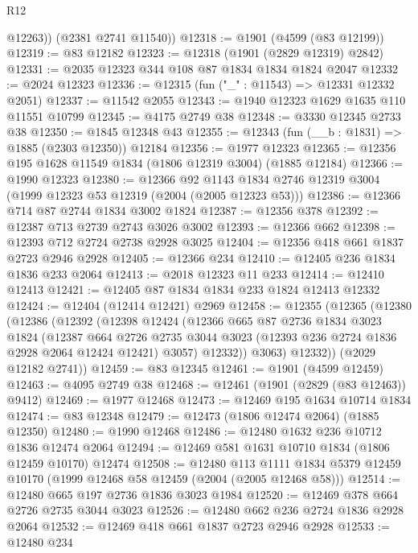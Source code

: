 \begin{lexlean}{R12}
\begin{coremodule}
          @12263))
      (@2381 @2741 @11540))
@12318 := @1901 (@4599 (@83 @12199))
@12319 := @83 @12182
@12323 := @12318 (@1901 (@2829 @12319) @2842)
@12331 := @2035 @12323 @344 @108 @87 @1834 @1834 @1824 @2047
@12332 := @2024 @12323
@12336 := @12315 (fun ("_" : @11543) => @12331 @12332 @2051)
@12337 := @11542 @2055
@12343 := @1940 @12323 @1629 @1635 @110 @11551 @10799
@12345 := @4175 @2749 @38
@12348 := @3330 @12345 @2733 @38
@12350 := @1845 @12348 @43
@12355 := @12343 (fun (__b : @1831) => @1885 (@2303 @12350)) @12184
@12356 := @1977 @12323
@12365 := @12356 @195 @1628 @11549 @1834 (@1806 @12319 @3004) (@1885 @12184)
@12366 := @1990 @12323
@12380 := @12366
    @92
    @1143
    @1834
    @2746
    @12319
    @3004
    (@1999 @12323 @53 @12319 (@2004 (@2005 @12323 @53)))
@12386 := @12366 @714 @87 @2744 @1834 @3002 @1824
@12387 := @12356 @378
@12392 := @12387 @713 @2739 @2743 @3026 @3002
@12393 := @12366 @662
@12398 := @12393 @712 @2724 @2738 @2928 @3025
@12404 := @12356 @418 @661 @1837 @2723 @2946 @2928
@12405 := @12366 @234
@12410 := @12405 @236 @1834 @1836 @233 @2064
@12413 := @2018 @12323 @11 @233
@12414 := @12410 @12413
@12421 := @12405 @87 @1834 @1834 @233 @1824 @12413 @12332
@12424 := @12404 (@12414 @12421) @2969
@12458 := @12355
    (@12365
      (@12380
        (@12386
          (@12392
            (@12398
              @12424
              (@12366
                @665
                @87
                @2736
                @1834
                @3023
                @1824
                (@12387
                  @664
                  @2726
                  @2735
                  @3044
                  @3023
                  (@12393 @236 @2724 @1836 @2928 @2064 @12424 @12421)
                  @3057)
                @12332))
            @3063)
          @12332))
      (@2029 @12182 @2741))
@12459 := @83 @12345
@12461 := @1901 (@4599 @12459)
@12463 := @4095 @2749 @38
@12468 := @12461 (@1901 (@2829 (@83 @12463)) @9412)
@12469 := @1977 @12468
@12473 := @12469 @195 @1634 @10714 @1834
@12474 := @83 @12348
@12479 := @12473 (@1806 @12474 @2064) (@1885 @12350)
@12480 := @1990 @12468
@12486 := @12480 @1632 @236 @10712 @1836 @12474 @2064
@12494 := @12469 @581 @1631 @10710 @1834 (@1806 @12459 @10170) @12474
@12508 := @12480
    @113
    @1111
    @1834
    @5379
    @12459
    @10170
    (@1999 @12468 @58 @12459 (@2004 (@2005 @12468 @58)))
@12514 := @12480 @665 @197 @2736 @1836 @3023 @1984
@12520 := @12469 @378 @664 @2726 @2735 @3044 @3023
@12526 := @12480 @662 @236 @2724 @1836 @2928 @2064
@12532 := @12469 @418 @661 @1837 @2723 @2946 @2928
@12533 := @12480 @234

\end{coremodule}
\end{lexlean}
